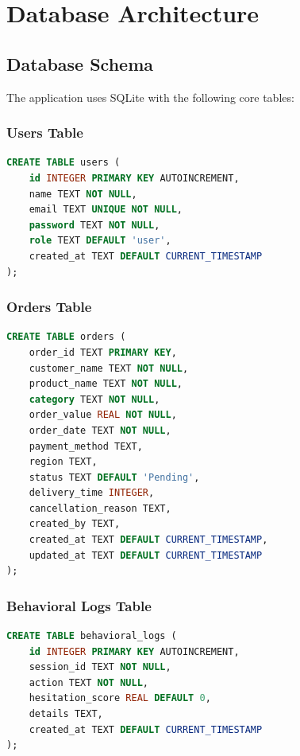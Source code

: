\documentclass[12pt,a4paper]{article}
\begin{document}
\newpage

\section{Database Architecture}


\subsection{Database Schema}

The application uses SQLite with the following core tables:

\subsubsection{Users Table}
\begin{lstlisting}[language=SQL]
CREATE TABLE users (
    id INTEGER PRIMARY KEY AUTOINCREMENT,
    name TEXT NOT NULL,
    email TEXT UNIQUE NOT NULL,
    password TEXT NOT NULL,
    role TEXT DEFAULT 'user',
    created_at TEXT DEFAULT CURRENT_TIMESTAMP
);
\end{lstlisting}

\subsubsection{Orders Table}
\begin{lstlisting}[language=SQL]
CREATE TABLE orders (
    order_id TEXT PRIMARY KEY,
    customer_name TEXT NOT NULL,
    product_name TEXT NOT NULL,
    category TEXT NOT NULL,
    order_value REAL NOT NULL,
    order_date TEXT NOT NULL,
    payment_method TEXT,
    region TEXT,
    status TEXT DEFAULT 'Pending',
    delivery_time INTEGER,
    cancellation_reason TEXT,
    created_by TEXT,
    created_at TEXT DEFAULT CURRENT_TIMESTAMP,
    updated_at TEXT DEFAULT CURRENT_TIMESTAMP
);
\end{lstlisting}

\subsubsection{Behavioral Logs Table}
\begin{lstlisting}[language=SQL]
CREATE TABLE behavioral_logs (
    id INTEGER PRIMARY KEY AUTOINCREMENT,
    session_id TEXT NOT NULL,
    action TEXT NOT NULL,
    hesitation_score REAL DEFAULT 0,
    details TEXT,
    created_at TEXT DEFAULT CURRENT_TIMESTAMP
);
\end{lstlisting}
\end{document}
